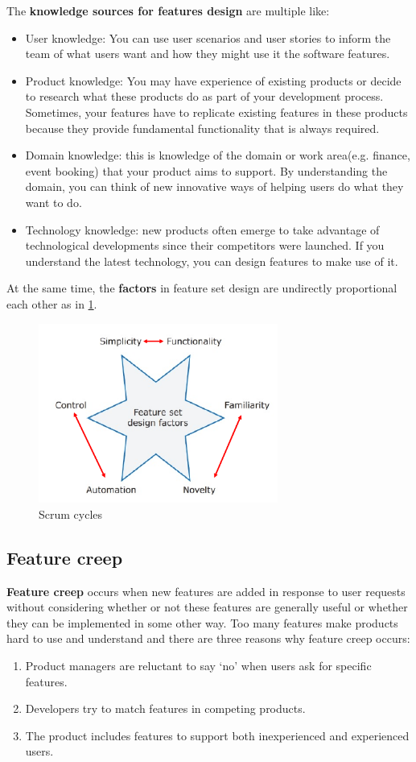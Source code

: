 \documentclass[10pt,a4paper]{report}
\begin{document}
The \textbf{knowledge sources for features design} are multiple like:
\begin{itemize}
	
	\item User knowledge: You can use user scenarios and user stories to inform the team of what users
	want and how they might use it the software features.
	\item Product knowledge: You may have experience of existing products or decide to research what these products do as part of your development process. Sometimes, your features have
	to replicate existing features in these products because they provide fundamental
	functionality that is always required.
	\item Domain knowledge: this is knowledge of the domain or work area(e.g. finance, event booking) that your product aims to support. By understanding the domain, you can think of new
	innovative ways of helping users do what they want to do.
	\item Technology knowledge: new products often emerge to take advantage of technological developments since their competitors were launched. If you understand the latest technology,
	you can design features to make use of it.
\end{itemize}
At the same time, the \textbf{factors} in feature set design are undirectly proportional each other as in \ref{image21}. 
\begin{figure}[h]
	\centering
	\includegraphics[width=0.7\textwidth]{image21}
	\caption{Scrum cycles}
	\label{image21}
\end{figure}

\subsection{Feature creep}
\textbf{Feature creep} occurs when new features are added in response to user requests without considering whether or not these features are generally
useful or whether they can be implemented in some other way.
 Too many features make products hard to use and understand and there are three reasons why feature creep occurs:
\begin{enumerate}
	\item Product managers are reluctant to say ‘no’ when users ask for specific features.
	\item Developers try to match features in competing products.
	\item The product includes features to support both inexperienced and experienced users.
\end{enumerate}
\end{document}
